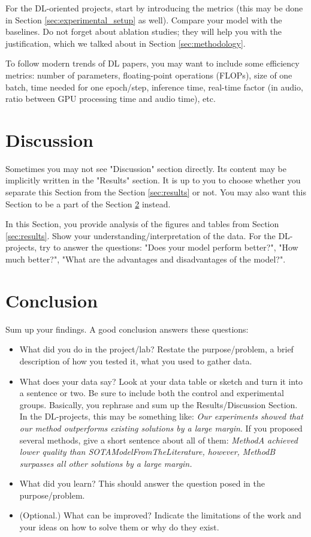 \documentclass[10pt,conference,compsocconf]{IEEEtran}
\begin{document}
For the DL-oriented projects, start by introducing the metrics (this may be done in Section \ref{sec:experimental_setup} as well). Compare your model with the baselines. Do not forget about ablation studies; they will help you with the justification, which we talked about in Section \ref{sec:methodology}.

To follow modern trends of DL papers, you may want to include some efficiency metrics: number of parameters, floating-point operations (FLOPs), size of one batch, time needed for one epoch/step, inference time, real-time factor (in audio, ratio between GPU processing time and audio time), etc. 

\section{Discussion}
Sometimes you may not see "Discussion" section directly. Its content may be implicitly written in the "Results" section. It is up to you to choose whether you separate this Section from the Section \ref{sec:results} or not. You may also want this Section to be a part of the Section \ref{sec:conclusion} instead.

In this Section, you provide analysis of the figures and tables from Section \ref{sec:results}. Show your understanding/interpretation of the data. For the DL-projects, try to answer the questions: "Does your model perform better?", "How much better?", "What are the advantages and disadvantages of the model?".


\section{Conclusion}\label{sec:conclusion}
Sum up your findings. A good conclusion answers these questions:
\begin{itemize}

\item What did you do in the project/lab? Restate the purpose/problem, a brief description of how you tested it, what you used to gather data.
\item What does your data say? Look at your data table or sketch and turn it into a sentence or two. Be sure to include both the control and experimental groups. Basically, you rephrase and sum up the Results/Discussion Section. In the DL-projects, this may be something like: \textit{Our experiments showed that our method outperforms existing solutions by a large margin}. If you proposed several methods, give a short sentence about all of them: \textit{MethodA achieved lower quality than SOTAModelFromTheLiterature, however, MethodB surpasses all other solutions by a large margin.}
\item What did you learn? This should answer the question posed in the purpose/problem.
\item (Optional.) What can be improved? Indicate the limitations of the work and your ideas on how to solve them or why do they exist.
\end{itemize}
\end{document}
